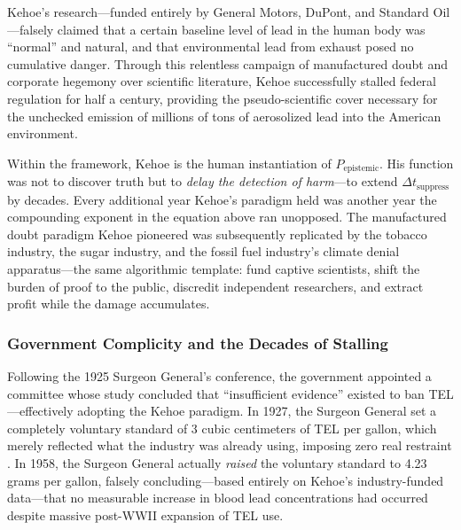 \documentclass[12pt,openany]{book}
\begin{document}
Kehoe's research---funded entirely by General Motors, DuPont, and Standard Oil---falsely claimed that a certain baseline level of lead in the human body was ``normal'' and natural, and that environmental lead from exhaust posed no cumulative danger. Through this relentless campaign of manufactured doubt and corporate hegemony over scientific literature, Kehoe successfully stalled federal regulation for half a century, providing the pseudo-scientific cover necessary for the unchecked emission of millions of tons of aerosolized lead into the American environment.

Within the framework, Kehoe is the human instantiation of $P_{\text{epistemic}}$. His function was not to discover truth but to \textit{delay the detection of harm}---to extend $\Delta t_{\text{suppress}}$ by decades. Every additional year Kehoe's paradigm held was another year the compounding exponent in the equation above ran unopposed. The manufactured doubt paradigm Kehoe pioneered was subsequently replicated by the tobacco industry, the sugar industry, and the fossil fuel industry's climate denial apparatus---the same algorithmic template: fund captive scientists, shift the burden of proof to the public, discredit independent researchers, and extract profit while the damage accumulates.

\subsubsection{Government Complicity and the Decades of Stalling}

Following the 1925 Surgeon General's conference, the government appointed a committee whose study concluded that ``insufficient evidence'' existed to ban TEL---effectively adopting the Kehoe paradigm. In 1927, the Surgeon General set a completely voluntary standard of 3 cubic centimeters of TEL per gallon, which merely reflected what the industry was already using, imposing zero real restraint \cite{tel_epa_history}. In 1958, the Surgeon General actually \textit{raised} the voluntary standard to 4.23 grams per gallon, falsely concluding---based entirely on Kehoe's industry-funded data---that no measurable increase in blood lead concentrations had occurred despite massive post-WWII expansion of TEL use.
\end{document}
